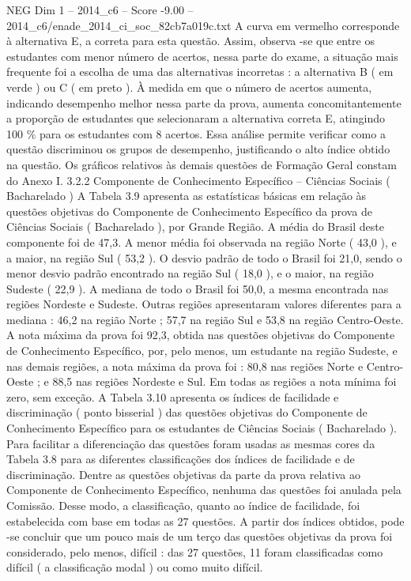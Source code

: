 \begin{textsample}{NEG Dim 1 – 2014\_c6 – Score -9.00 – 2014\_c6/enade\_2014\_ci\_soc\_82cb7a019c.txt}
A curva em vermelho corresponde à alternativa E, a correta para esta questão.
Assim, observa -se que entre os estudantes com menor número de acertos, nessa parte do exame, a situação mais frequente foi a escolha de uma das alternativas incorretas : a alternativa B ( em verde ) ou C ( em preto ).
À medida em que o número de acertos aumenta, indicando desempenho melhor nessa parte da prova, aumenta concomitantemente a proporção de estudantes que selecionaram a alternativa correta E, atingindo 100 \% para os estudantes com 8 acertos.
Essa análise permite verificar como a questão discriminou os grupos de desempenho, justificando o alto índice obtido na questão.
Os gráficos relativos às demais questões de Formação Geral constam do Anexo I. 3.2.2 Componente de Conhecimento Específico – Ciências Sociais ( Bacharelado ) A Tabela 3.9 apresenta as estatísticas básicas em relação às questões objetivas do Componente de Conhecimento Específico da prova de Ciências Sociais ( Bacharelado ), por Grande Região.
A média do Brasil deste componente foi de 47,3.
A menor média foi observada na região Norte ( 43,0 ), e a maior, na região Sul ( 53,2 ).
O desvio padrão de todo o Brasil foi 21,0, sendo o menor desvio padrão encontrado na região Sul ( 18,0 ), e o maior, na região Sudeste ( 22,9 ).
A mediana de todo o Brasil foi 50,0, a mesma encontrada nas regiões Nordeste e Sudeste.
Outras regiões apresentaram valores diferentes para a mediana : 46,2 na região Norte ; 57,7 na região Sul e 53,8 na região Centro-Oeste.
A nota máxima da prova foi 92,3, obtida nas questões objetivas do Componente de Conhecimento Específico, por, pelo menos, um estudante na região Sudeste, e nas demais regiões, a nota máxima da prova foi : 80,8 nas regiões Norte e Centro-Oeste ; e 88,5 nas regiões Nordeste e Sul.
Em todas as regiões a nota mínima foi zero, sem exceção.
A Tabela 3.10 apresenta os índices de facilidade e discriminação ( ponto bisserial ) das questões objetivas do Componente de Conhecimento Específico para os estudantes de Ciências Sociais ( Bacharelado ).
Para facilitar a diferenciação das questões foram usadas as mesmas cores da Tabela 3.8 para as diferentes classificações dos índices de facilidade e de discriminação.
Dentre as questões objetivas da parte da prova relativa ao Componente de Conhecimento Específico, nenhuma das questões foi anulada pela Comissão.
Desse modo, a classificação, quanto ao índice de facilidade, foi estabelecida com base em todas as 27 questões.
A partir dos índices obtidos, pode -se concluir que um pouco mais de um terço das questões objetivas da prova foi considerado, pelo menos, difícil : das 27 questões, 11 foram classificadas como difícil ( a classificação modal ) ou como muito difícil.

\end{textsample}
